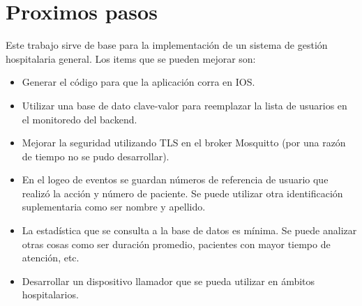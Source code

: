 \section{Proximos pasos}


Este trabajo sirve de base para la implementación de un sistema de gestión hospitalaria general. Los items que se pueden mejorar son:

\begin{itemize}
\item Generar el código para que la aplicación corra en IOS.
\item Utilizar una base de dato clave-valor para reemplazar la lista de usuarios en el monitoredo del backend.
\item Mejorar la seguridad utilizando TLS en el broker Mosquitto (por una razón de tiempo no se pudo desarrollar).
\item En el logeo de eventos se guardan números de referencia de usuario que realizó la acción y número de paciente. Se puede utilizar otra identificación suplementaria como ser nombre y apellido.
\item La estadística que se consulta a la base de datos es mínima. Se puede analizar otras cosas como ser duración promedio, pacientes con mayor tiempo de atención, etc.
\item Desarrollar un dispositivo llamador que se pueda utilizar en ámbitos hospitalarios.

\end{itemize}
